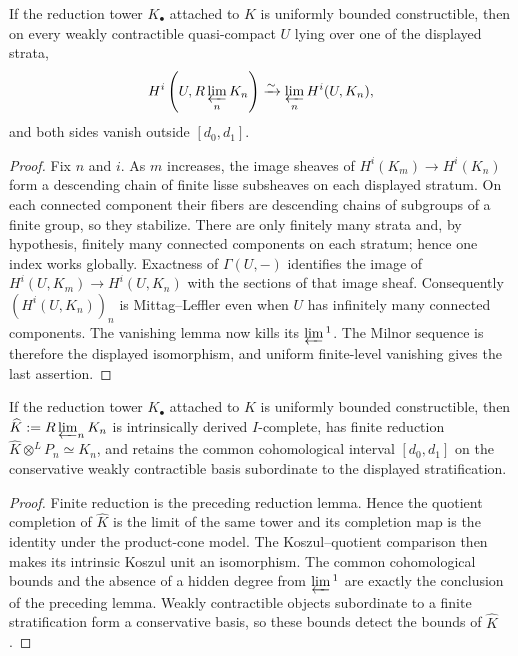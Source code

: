\begin{lemma}
\label{lemma:weil-pbc-constructible-adic-lim-one-zero}
If the reduction tower $K_\bullet$ attached to $K$ is uniformly bounded
constructible, then on every weakly contractible quasi-compact $U$ lying
over one of the displayed strata,
\[
 H^i\left(U,R\varprojlim_nK_n\right)
 \xrightarrow{\sim}\varprojlim_nH^i(U,K_n),
\]
and both sides vanish outside $[d_0,d_1]$.
\end{lemma}
\begin{proof}

Fix $n$ and $i$.  As $m$ increases, the image sheaves of
 $H^i(K_m)\to H^i(K_n)$ form a descending chain of finite lisse subsheaves on
each displayed stratum.  On each connected component their fibers are
descending chains of subgroups of a finite group, so they stabilize.  There
are only finitely many strata and, by hypothesis, finitely many connected
components on each stratum; hence one index works globally.  Exactness of
$\Gamma(U,-)$ identifies the
image of $H^i(U,K_m)\to H^i(U,K_n)$ with the sections of that image sheaf.
Consequently $(H^i(U,K_n))_n$ is Mittag--Leffler even when $U$ has
infinitely many connected components.  The vanishing lemma now kills its
$\varprojlim{}^1$.  The Milnor sequence is therefore the displayed
isomorphism, and uniform finite-level vanishing gives the last assertion.
\end{proof}

\begin{lemma}
\label{lemma:weil-pbc-bounded-constructible-reconstruction}
\uses{}

If the reduction tower $K_\bullet$ attached to $K$ is uniformly bounded
constructible, then
$\widehat K:=R\varprojlim_nK_n$ is intrinsically derived $I$-complete, has
finite reduction $\widehat K\otimes^LP_n\simeq K_n$, and retains the common
cohomological interval $[d_0,d_1]$ on the conservative weakly contractible
basis subordinate to the displayed stratification.
\end{lemma}
\begin{proof}

Finite reduction is the preceding reduction lemma.  Hence the quotient
completion of $\widehat K$ is the limit of the same tower and its completion
map is the identity under the product-cone model.  The Koszul--quotient
comparison then makes its intrinsic Koszul unit an isomorphism.  The common
cohomological bounds and the absence of a hidden degree from
$\varprojlim{}^1$ are exactly the conclusion of the preceding lemma.
Weakly contractible objects subordinate to a finite stratification form a
conservative basis, so these bounds detect the bounds of $\widehat K$.
\end{proof}

